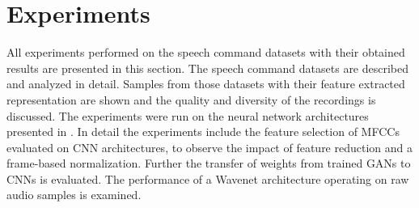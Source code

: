 
\chapter{Experiments}\label{sec:exp}
All experiments performed on the speech command datasets with their obtained results are presented in this section.
The speech command datasets are described and analyzed in detail.
Samples from those datasets with their feature extracted representation are shown and the quality and diversity of the recordings is discussed.
The experiments were run on the neural network architectures presented in .
In detail the experiments include the feature selection of MFCCs evaluated on CNN architectures, to observe the impact of feature reduction and a frame-based normalization.
Further the transfer of weights from trained GANs to CNNs is evaluated.
The performance of a Wavenet architecture operating on raw audio samples is examined.








